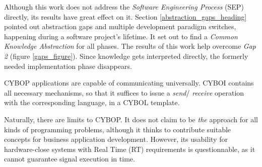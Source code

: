 Although this work does not address the \emph{Software Engineering Process}
(SEP) directly, its results have great effect on it. Section
\ref{abstraction_gaps_heading} pointed out abstraction gaps and multiple
development paradigm switches, happening during a software project's lifetime.
It set out to find a \emph{Common Knowledge Abstraction} for all phases. The
results of this work help overcome \emph{Gap 2} (figure \ref{gaps_figure}).
Since knowledge gets interpreted directly, the formerly needed implementation
phase disappears.

CYBOP applications are capable of communicating universally. CYBOI contains all
necessary mechanisms, so that it suffices to issue a \emph{send}/
\emph{receive} operation with the corresponding language, in a CYBOL template.

Naturally, there are limits to CYBOP. It does not claim to be \emph{the}
approach for all kinds of programming problems, although it thinks to
contribute suitable concepts for business application development. However, its
usability for hardware-close systems with Real Time (RT) requirements is
questionnable, as it cannot guarantee signal execution in time.
